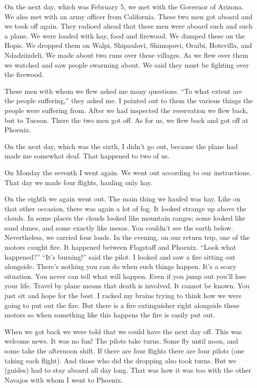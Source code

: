 On the next day, which was February 5, we met with the Governor of Arizona. We also met with an army officer from California. These two men got aboard and we took off again. They radioed ahead that these men were aboard such and such a plane. We were loaded with hay, food and firewood. We dumped these on the Hopis. We dropped them on Walpi, Shipaulovi, Shimopovi, Oraibi, Hotevilla, and Ndadziizdeli. We made about two runs over these villages. As we flew over them we watched and saw people swarming about. We said they must be fighting over the firewood.

These men with whom we flew asked me many questions. ``To what extent are the people suffering,'' they asked me. I pointed out to them the various things the people were suffering from. After we had inspected the reservation we flew back, but to Tucson. There the two men got off. As for us, we flew back and got off at Phoenix.

On the next day, which was the sixth, I didn't go out, because the plane had made me somewhat deaf. That happened to two of us.

On Monday the seventh I went again. We went out according to our instructions. That day we made four flights, hauling only hay.

On the eighth we again went out. The main thing we hauled was hay. Like on that other occasion, there was again a lot of fog. It looked strange up above the clouds. In some places the clouds looked like mountain ranges; some looked like sand dunes, and some exactly like mesas. You couldn't see the earth below. Nevertheless, we carried four loads. In the evening, on our return trip, one of the motors caught fire. It happened between Flagstaff and Phoenix. ``Look what happened?'' ``It's burning!'' said the pilot. I looked and saw a fire sitting out alongside. There's nothing you can do when such things happen. It's a scary situation. You never can tell what will happen. Even if you jump out you'll lose your life. Travel by plane means that death is involved. It cannot be known. You just sit and hope for the best. I racked my brains trying to think how we were going to put out the fire. But there is a fire extinguisher right alongside these motors so when something like this happens the fire is easily put out.

When we got back we were told that we could have the next day off. This was welcome news. It was no fun! The pilots take turns. Some fly until noon, and some take the afternoon shift. If there are four flights there are four pilots (one taking each flight). And those who did the dropping also took turns. But we (guides) had to stay aboard all day long. That was how it was too with the other Navajos with whom I went to Phoenix.

